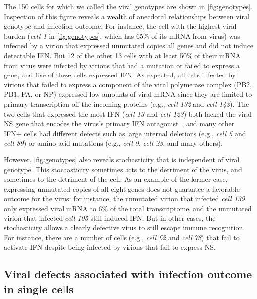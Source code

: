 \documentclass[10pt,letterpaper]{article}
\newcommand{\FIG}[1]{\autoref{fig:#1}}
\begin{document}
The 150 cells for which we called the viral genotypes are shown in \FIG{genotypes}.
Inspection of this figure reveals a wealth of anecdotal relationships between viral genotype and infection outcome.
For instance, the cell with the highest viral burden (\textit{cell 1} in \FIG{genotypes}, which has 65\% of its mRNA from virus) was infected by a virion that expressed unmutated copies all genes and did not induce detectable IFN.
But 12 of the other 13 cells with at least 50\% of their mRNA from virus were infected by virions that had a mutation or failed to express a gene, and five of these cells expressed IFN.
As expected, all cells infected by virions that failed to express a component of the viral polymerase complex (PB2, PB1, PA, or NP) expressed low amounts of viral mRNA since they are limited to primary transcription off the incoming proteins (e.g., \textit{cell 132} and \textit{cell 143}).
The two cells that expressed the most IFN (\textit{cell 13} and \textit{cell 123}) both lacked the viral NS gene that encodes the virus's primary IFN antagonist~\citep{garcia1998influenza, hale2008multifunctional}, and many other IFN+ cells had different defects such as large internal deletions (e.g., \textit{cell 5} and \textit{cell 89}) or amino-acid mutations (e.g., \textit{cell 9}, \textit{cell 28}, and many others).

However, \FIG{genotypes} also reveals stochasticity that is independent of viral genotype.
This stochasticity sometimes acts to the detriment of the virus, and sometimes to the detriment of the cell.
As an example of the former case, expressing unmutated copies of all eight genes does not guarantee a favorable outcome for the virus: for instance, the unmutated virion that infected \textit{cell 139} only expressed viral mRNA to 6\% of the total transcriptome, and the unmutated virion that infected \textit{cell 105} still induced IFN.
But in other cases, the stochasticity allows a clearly defective virus to still escape immune recognition.
For instance, there are a number of cells (e.g., \textit{cell 62} and \textit{cell 78}) that fail to activate IFN despite being infected by virions that fail to express NS.

\subsection*{Viral defects associated with infection outcome in single cells}
\end{document}
